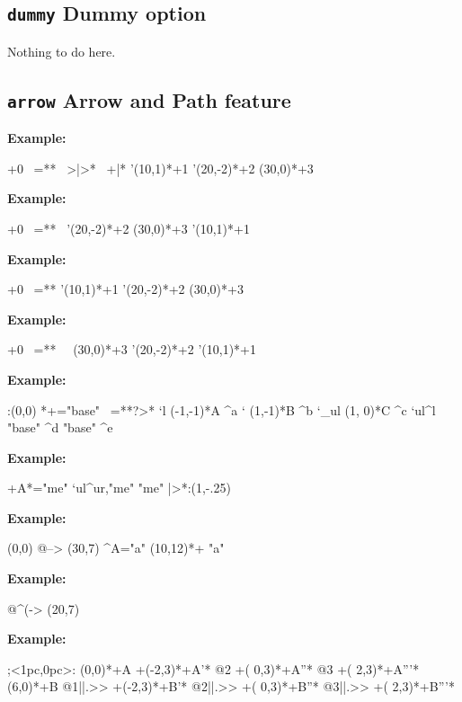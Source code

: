 \documentclass{article}
\newenvironment{code}{\par\noindent\textbf{Example:}\par\noindent}{}
\begin{document}
\subsection{\texttt{dummy} Dummy option}
Nothing to do here.
\subsection{\texttt{arrow} Arrow and Path feature}

\begin{code}
\xy*+{0}\PATH
 ~={**\dir{-}}
 ~>{|>*\dir{>}}
 ~+{|*\dir{/}}
 '(10,1)*+{1} '(20,-2)*+{2} (30,0)*+{3}
\endxy
\end{code}
\begin{code}
\xy *+{0} \PATH ~={**\dir{-}}
  ~{'(20,-2)*+{2} (30,0)*+{3}} '(10,1)*+{1}
\endxy
\end{code}
\begin{code}
\xy *+{0} \PATH ~={**\dir{-}}
  '(10,1)*+{1} '(20,-2)*+{2} (30,0)*+{3}
\endxy
\end{code}
\begin{code}
\xy *+{0} \PATH ~={**\dir{-}}
 ~{~{(30,0)*+{3}}
 '(20,-2)*+{2}} '(10,1)*+{1}
\endxy
\end{code}
\begin{code}
\xy <4pc,0pc>:(0,0)
 *+="base"
 \PATH ~={**\dir{-}?>*\dir{>}}
       `l   (-1,-1)*{A} ^a
       `     (1,-1)*{B} ^b
       `_ul  (1, 0)*{C} ^c
       `ul^l "base"     ^d
             "base"     ^e
\endxy
\end{code}
\begin{code}
\xy *+{A}*\cir<10pt>{}="me"
 \PATH `ul^ur,"me" "me" |>*:(1,-.25)\dir{>}
\endxy
\end{code}
\begin{code}
\xy(0,0)
 \ar @{-->} (30,7) ^A="a"
 \POS(10,12)*+ \ar "a"
\endxy
\end{code}
\begin{code}
\xy\ar @^{(->} (20,7)\endxy
\end{code}
\begin{code}
\xy ;<1pc,0pc>:
 \POS(0,0)*+{A}
 \ar    +(-2,3)*+{A'}*\cir{}
 \ar @2 +( 0,3)*+{A''}*\cir{}
 \ar @3 +( 2,3)*+{A'''}*\cir{}
 \POS(6,0)*+{B}
 \ar @1{||.>>} +(-2,3)*+{B'}*\cir{}
 \ar @2{||.>>} +( 0,3)*+{B''}*\cir{}
 \ar @3{||.>>} +( 2,3)*+{B'''}*\cir{}
\endxy
\end{code}
\end{document}

